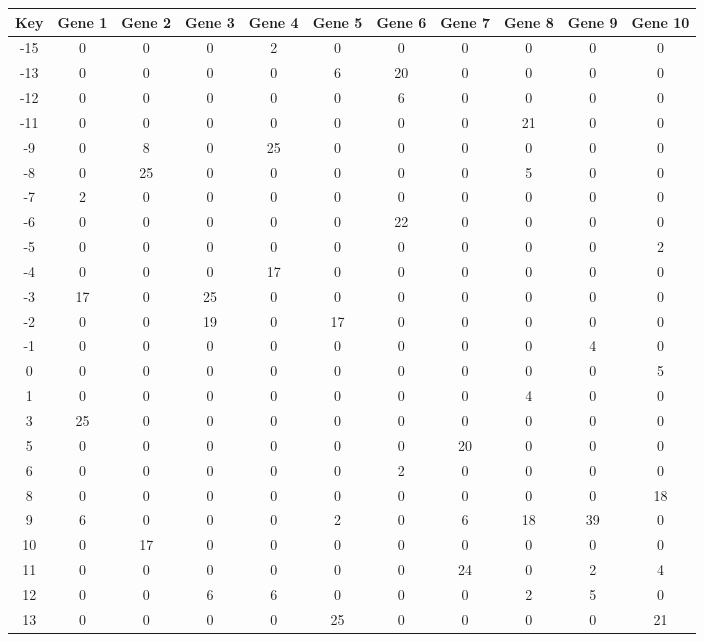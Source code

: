 \begin{tabular}{|c|c|c|c|c|c|c|c|c|c|c|}
\hline
Key & Gene 1 & Gene 2 & Gene 3 & Gene 4 & Gene 5 & Gene 6 & Gene 7 & Gene 8 & Gene 9 & Gene 10 \\
\hline
-15 & 0 & 0 & 0 & 2 & 0 & 0 & 0 & 0 & 0 & 0 \\
-13 & 0 & 0 & 0 & 0 & 6 & 20 & 0 & 0 & 0 & 0 \\
-12 & 0 & 0 & 0 & 0 & 0 & 6 & 0 & 0 & 0 & 0 \\
-11 & 0 & 0 & 0 & 0 & 0 & 0 & 0 & 21 & 0 & 0 \\
-9 & 0 & 8 & 0 & 25 & 0 & 0 & 0 & 0 & 0 & 0 \\
-8 & 0 & 25 & 0 & 0 & 0 & 0 & 0 & 5 & 0 & 0 \\
-7 & 2 & 0 & 0 & 0 & 0 & 0 & 0 & 0 & 0 & 0 \\
-6 & 0 & 0 & 0 & 0 & 0 & 22 & 0 & 0 & 0 & 0 \\
-5 & 0 & 0 & 0 & 0 & 0 & 0 & 0 & 0 & 0 & 2 \\
-4 & 0 & 0 & 0 & 17 & 0 & 0 & 0 & 0 & 0 & 0 \\
-3 & 17 & 0 & 25 & 0 & 0 & 0 & 0 & 0 & 0 & 0 \\
-2 & 0 & 0 & 19 & 0 & 17 & 0 & 0 & 0 & 0 & 0 \\
-1 & 0 & 0 & 0 & 0 & 0 & 0 & 0 & 0 & 4 & 0 \\
0 & 0 & 0 & 0 & 0 & 0 & 0 & 0 & 0 & 0 & 5 \\
1 & 0 & 0 & 0 & 0 & 0 & 0 & 0 & 4 & 0 & 0 \\
3 & 25 & 0 & 0 & 0 & 0 & 0 & 0 & 0 & 0 & 0 \\
5 & 0 & 0 & 0 & 0 & 0 & 0 & 20 & 0 & 0 & 0 \\
6 & 0 & 0 & 0 & 0 & 0 & 2 & 0 & 0 & 0 & 0 \\
8 & 0 & 0 & 0 & 0 & 0 & 0 & 0 & 0 & 0 & 18 \\
9 & 6 & 0 & 0 & 0 & 2 & 0 & 6 & 18 & 39 & 0 \\
10 & 0 & 17 & 0 & 0 & 0 & 0 & 0 & 0 & 0 & 0 \\
11 & 0 & 0 & 0 & 0 & 0 & 0 & 24 & 0 & 2 & 4 \\
12 & 0 & 0 & 6 & 6 & 0 & 0 & 0 & 2 & 5 & 0 \\
13 & 0 & 0 & 0 & 0 & 25 & 0 & 0 & 0 & 0 & 21 \\
\hline
\end{tabular}